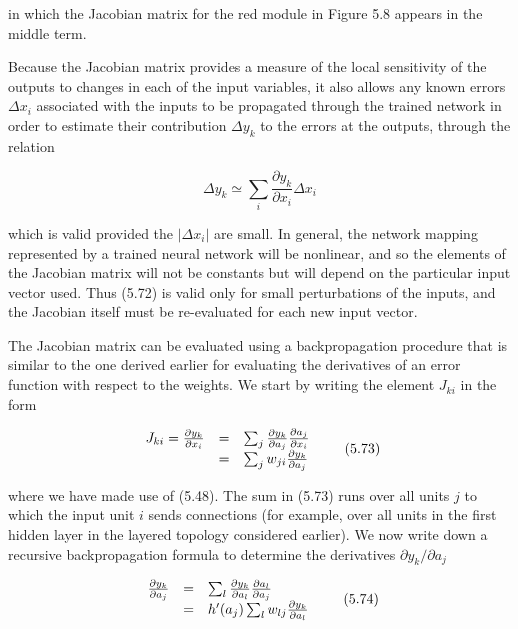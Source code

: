 \documentclass[
  10
]{article}
\begin{document}
in which the Jacobian matrix for the red module in Figure 5.8 appears in
the middle term.

Because the Jacobian matrix provides a measure of the local sensitivity
of the outputs to changes in each of the input variables, it also allows
any known errors \(\Delta x _ { i }\) associated with the inputs to be
propagated through the trained network in order to estimate their
contribution \(\Delta y _ { k }\) to the errors at the outputs, through
the relation

\[
\Delta y _ {k} \simeq \sum_ {i} \frac {\partial y _ {k}}{\partial x _ {i}} \Delta x _ {i}\tag{5.72}
\]

which is valid provided the \(\lvert \Delta x _ { i } \rvert\) are
small. In general, the network mapping represented by a trained neural
network will be nonlinear, and so the elements of the Jacobian matrix
will not be constants but will depend on the particular input vector
used. Thus (5.72) is valid only for small perturbations of the inputs,
and the Jacobian itself must be re-evaluated for each new input vector.

The Jacobian matrix can be evaluated using a backpropagation procedure
that is similar to the one derived earlier for evaluating the
derivatives of an error function with respect to the weights. We start
by writing the element \(J _ { k i }\) in the form

\[
\begin{array}{r c l} J _ {k i} = \frac {\partial y _ {k}}{\partial x _ {i}} & = & \sum_ {j} \frac {\partial y _ {k}}{\partial a _ {j}} \frac {\partial a _ {j}}{\partial x _ {i}} \\ & = & \sum_ {j} w _ {j i} \frac {\partial y _ {k}}{\partial a _ {j}} \end{array}\tag{5.73}
\]

where we have made use of (5.48). The sum in (5.73) runs over all units
\(j\) to which the input unit \(i\) sends connections (for example, over
all units in the first hidden layer in the layered topology considered
earlier). We now write down a recursive backpropagation formula to
determine the derivatives
\(\partial { y _ { k } } / \partial { a _ { j } }\)

\[
\begin{array}{r c l} \frac {\partial y _ {k}}{\partial a _ {j}} & = & \sum_ {l} \frac {\partial y _ {k}}{\partial a _ {l}} \frac {\partial a _ {l}}{\partial a _ {j}} \\ & = & h ^ {\prime} (a _ {j}) \sum_ {l} w _ {l j} \frac {\partial y _ {k}}{\partial a _ {l}} \end{array}\tag{5.74}
\]
\end{document}
